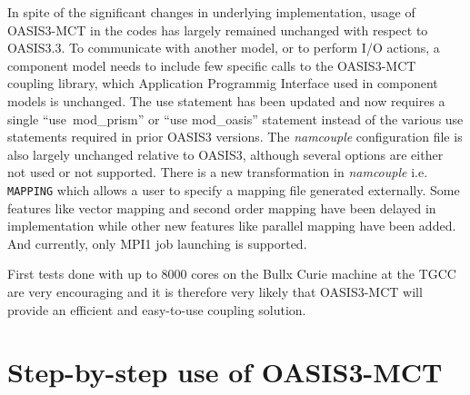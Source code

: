 In spite of the significant changes in underlying implementation, usage of OASIS3-MCT in the codes has largely remained unchanged with respect to OASIS3.3.
To communicate with another model, or to perform I/O actions, a component model needs to include few specific calls to the OASIS3-MCT coupling library, which Application Programmig Interface used in component models is unchanged.  The use 
statement has been updated and now requires a single ``use\ mod\_prism'' or ``use mod\_oasis'' statement instead of the various use statements required in prior
OASIS3 versions.  The {\it namcouple} configuration file is also largely unchanged
relative to OASIS3, although several options are either not used
or not supported.  There is a new transformation in {\it namcouple}
i.e. {\tt MAPPING} which allows a user to specify a mapping
file generated externally.  Some features like vector mapping
and second order mapping have been delayed in implementation
while other new features like parallel mapping have been added.
And currently, only MPI1 job launching is supported.
 
First tests done with up to
8000 cores on the Bullx Curie machine at the TGCC are very encouraging
and it is therefore very likely that OASIS3-MCT will provide an efficient and
easy-to-use coupling solution. 


\section{Step-by-step use of OASIS3-MCT}


